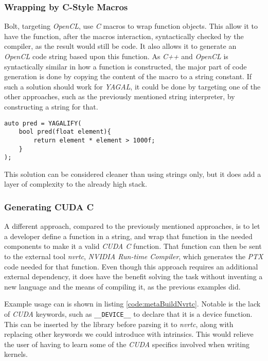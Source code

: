 \subsubsection{Wrapping by C-Style Macros}
Bolt, targeting \textit{OpenCL}, use \textit{C} macros to wrap function objects. This allow it to have the function, after the macros interaction, syntactically checked by the compiler, as the result would still be code. It also allows it to generate an \textit{OpenCL} code string based upon this function. As \textit{C++} and \textit{OpenCL} is syntactically similar in how a function is constructed, the major part of code generation is done by copying the content of the macro to a string constant. If such a solution should work for \textit{YAGAL}, it could be done by targeting one of the other approaches, such as the previously mentioned string interpreter, by constructing a string for that.

\begin{lstlisting}[caption={Code showing possible construction of kernel with macro, named YAGALIFY, and \textit{C++} lambda.}, label={code:metaBuildMacro}]
auto pred = YAGALIFY(
    bool pred(float element){
        return element * element > 1000f;
    }
);
\end{lstlisting}

This solution can be considered cleaner than using strings only, but it does add a layer of complexity to the already high stack.

\subsubsection{Generating CUDA C}
A different approach, compared to the previously mentioned approaches, is to let a developer define a function in a string, and wrap that function in the needed components to make it a valid \textit{CUDA C} function. That function can then be sent to the external tool \textit{nvrtc}\cite{nvrtcDoc}, \textit{NVIDIA Run-time Compiler}, which generates the \textit{PTX} code needed for that function. Even though this approach requires an additional external dependency, it does have the benefit solving the task without inventing a new language and the means of compiling it, as the previous examples did.

Example usage can is shown in listing \ref{code:metaBuildNvrtc}. Notable is the lack of \textit{CUDA} keywords, such as \texttt{\_\_DEVICE\_\_} to declare that it is a device function. This can be inserted by the library before parsing it to \textit{nvrtc}, along with replacing other keywords we could introduce with intrinsics. This would relieve the user of having to learn some of the \textit{CUDA} specifics involved when writing kernels.

